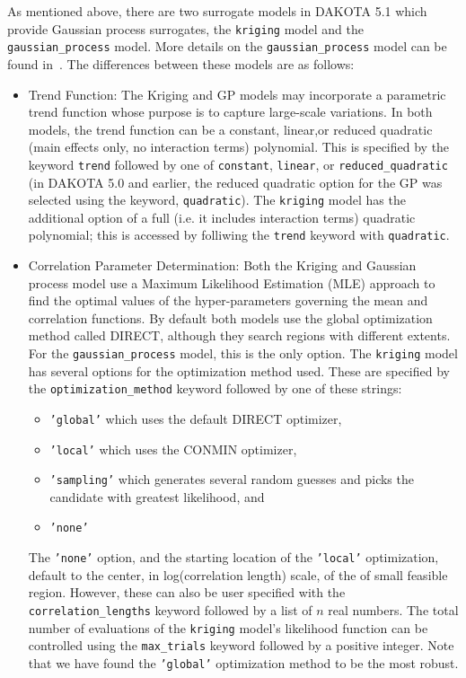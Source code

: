 As mentioned above, there are two surrogate models in DAKOTA 5.1
which provide Gaussian process surrogates, the \texttt{kriging} 
model and the \texttt{gaussian\_process} model.  More details on 
the \texttt{gaussian\_process} model can be found in~\cite{McF08}. 
The differences between these models are as follows: 

\begin{itemize}

\item Trend Function:  The Kriging and GP models may incorporate 
a parametric trend function whose purpose is to capture large-scale 
variations. In both models, the trend function can be a constant, 
linear,or reduced quadratic (main effects only, no interaction 
terms) polynomial.  This is specified by the keyword \texttt{trend}
followed by one of \texttt{constant}, \texttt{linear}, or 
\texttt{reduced\_quadratic} (in DAKOTA 5.0 and earlier, the reduced 
quadratic option for the GP was selected using the keyword, 
\texttt{quadratic}). The \texttt{kriging} model has the additional 
option of a full (i.e. it includes interaction terms) quadratic 
polynomial; this is accessed by folliwing the \texttt{trend} keyword
with \texttt{quadratic}.

\item Correlation Parameter Determination: Both the Kriging and 
Gaussian process model use a Maximum Likelihood Estimation (MLE) 
approach to find the optimal values of the hyper-parameters governing the 
mean and correlation functions. By default both models use the global 
optimization method called DIRECT, although they search regions with
different extents. For the \texttt{gaussian\_process} model, this is the
only option.  The \texttt{kriging} model has several options for the 
optimization method used.  These are specified by the 
\texttt{optimization\_method} keyword followed by one of these strings:
\begin{itemize}
\item \texttt{'global'} which uses the default DIRECT optimizer,
\item \texttt{'local'} which uses the CONMIN optimizer,
\item \texttt{'sampling'} which generates several random guesses and 
picks the candidate with greatest likelihood, and
\item \texttt{'none'} 
\end{itemize} 
The \texttt{'none'} option, and the starting location of the \texttt{'local'}
optimization, default to the center, in log(correlation length) scale, 
of the of small feasible region.  However, these can also be user 
specified with the \texttt{correlation\_lengths} keyword followed by 
a list of $n$ real numbers.  The total number of evaluations of the 
\texttt{kriging} model's likelihood function can be controlled using
the \texttt{max\_trials} keyword followed by a positive integer.
Note that we have found the \texttt{'global'} optimization method to be 
the most robust.


\end{itemize}
